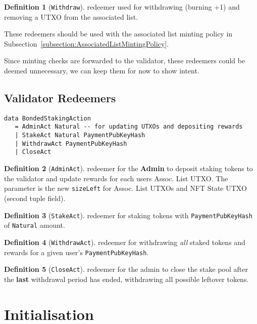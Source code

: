 \documentclass[10pt, a4paper]{article}
\theoremstyle{definition}
\newtheorem{definition}{Definition}[section]
\begin{document}
\begin{definition}[\texttt{Withdraw}]\label{def:Withdraw} redeemer used for withdrawing (burning +1) and removing a UTXO from the associated list.
\end{definition}

These redeemers should be used with the associated list minting policy in Subsection~\ref{subsection:AssociatedListMintingPolicy}.

Since minting checks are forwarded to the validator, these redeemers could be deemed unnecessary, we can keep them for now to show intent.

\subsection{Validator Redeemers}
\begin{verbatim}
data BondedStakingAction
   = AdminAct Natural -- for updating UTXOs and depositing rewards
   | StakeAct Natural PaymentPubKeyHash
   | WithdrawAct PaymentPubKeyHash
   | CloseAct
\end{verbatim}

\begin{definition}[\texttt{AdminAct}]\label{def:AdminAct} redeemer for the \textbf{Admin} to deposit staking tokens to the validator and update rewards for each users Assoc. List UTXO. The parameter is the new \texttt{sizeLeft} for Assoc. List UTXOs and NFT State UTXO (second tuple field).
\end{definition}

\begin{definition}[\texttt{StakeAct}]\label{def:StakeAct} redeemer for staking tokens with \texttt{PaymentPubKeyHash} of \texttt{Natural} amount.
\end{definition}

\begin{definition}[\texttt{WithdrawAct}]\label{def:WithdrawAct} redeemer for withdrawing \textit{all} staked tokens and rewards for a given user's \texttt{PaymentPubKeyHash}.
\end{definition}

\begin{definition}[\texttt{CloseAct}]\label{def:CloseAct} redeemer for the admin to close the stake pool after the \textbf{last} withdrawal period has ended, withdrawing all possible leftover tokens.
\end{definition}

\section{Initialisation}\label{section:initialisation}
\end{document}
